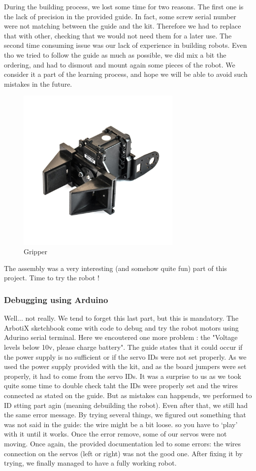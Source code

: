 \documentclass[aps,letterpaper,11pt]{revtex4}
\begin{document}
During the building process, we lost some time for two reasons. The first one is the lack of precision in the provided guide. In fact, some screw serial number were not matching between the guide and the kit. Therefore we had to replace that with other, checking that we would not need them for a later use. The second time consuming issue was our lack of experience in building robots. Even tho we tried to follow the guide as much as possible, we did mix a bit the ordering, and had to dismout and mount again some pieces of the robot. We consider it a part of the learning process, and hope we will be able to avoid such mistakes in the future.
\begin{figure}[H]
	\centering
	\includegraphics[height=8cm]{grip4.jpg}
	\caption{Gripper}
	\label{fig:Gripper}    
\end{figure}

The assembly was a very interesting (and somehow quite fun) part of this project. Time to try the robot !

\subsubsection{Debugging using Arduino}
Well... not really. We tend to forget this last part, but this is mandatory. The ArbotiX sketchbook come with code to debug and try the robot motors using Adurino serial terminal. Here we encoutered one more problem : the "Voltage levels below 10v, please charge battery". The guide states that it could occur if the power supply is no sufficient or if the servo IDs were not set properly. As we used the power supply provided with the kit, and as the board jumpers were set properly, it had to come from the servo IDs. It was a surprise to us as we took quite some time to double check taht the IDs were properly set and the wires connected as stated on the guide. But as mistakes can happends, we performed to ID stting part agin (meaning debuilding the robot). Even after that, we still had the same error message. By trying several things, we figured out something that was not said in the guide: the wire might be a bit loose. so you have to `play' with it until it works. Once the error remove, some of our servos were not moving. Once again, the provided documentation led to some errors: the wires connection on the servos (left or right) was not the good one. After fixing it by trying, we finally managed to have a fully working robot.
\end{document}
